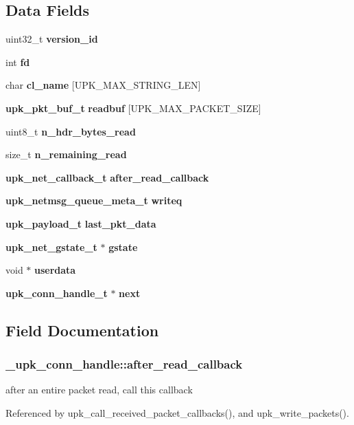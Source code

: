 \subsection*{Data Fields}
\begin{DoxyCompactItemize}
\item 
uint32\_\-t {\bf version\_\-id}
\item 
int {\bf fd}
\item 
char {\bf cl\_\-name} [UPK\_\-MAX\_\-STRING\_\-LEN]
\item 
{\bf upk\_\-pkt\_\-buf\_\-t} {\bf readbuf} [UPK\_\-MAX\_\-PACKET\_\-SIZE]
\item 
uint8\_\-t {\bf n\_\-hdr\_\-bytes\_\-read}
\item 
size\_\-t {\bf n\_\-remaining\_\-read}
\item 
{\bf upk\_\-net\_\-callback\_\-t} {\bf after\_\-read\_\-callback}
\item 
{\bf upk\_\-netmsg\_\-queue\_\-meta\_\-t} {\bf writeq}
\item 
{\bf upk\_\-payload\_\-t} {\bf last\_\-pkt\_\-data}
\item 
{\bf upk\_\-net\_\-gstate\_\-t} $\ast$ {\bf gstate}
\item 
void $\ast$ {\bf userdata}
\item 
{\bf upk\_\-conn\_\-handle\_\-t} $\ast$ {\bf next}
\end{DoxyCompactItemize}


\subsection{Field Documentation}
\subsubsection[{after\_\-read\_\-callback}]{ {\bf \_\-upk\_\-conn\_\-handle::after\_\-read\_\-callback}}\label{struct__upk__conn__handle_a1eaabc8b82f399d9abf3d91a44ccdef8}
after an entire packet read, call this callback 

Referenced by upk\_\-call\_\-received\_\-packet\_\-callbacks(), and upk\_\-write\_\-packets().

